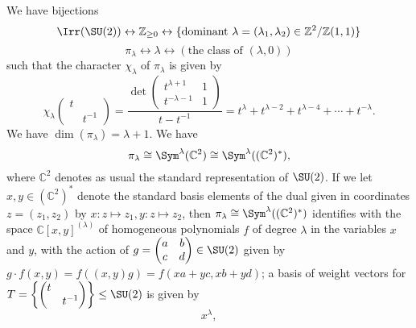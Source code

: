 \documentclass[reqno]{amsart} 
\begin{document}
\begin{theorem}
  We have bijections
  \begin{equation}\label{eq:}
    \Irr(\SU(2))
    \leftrightarrow
    \mathbb{Z}_{\geq 0}
    \leftrightarrow 
    \{\text{dominant }
    \lambda = (\lambda_1,\lambda_2) \in
    \mathbb{Z}^2/\mathbb{Z}(1,1)\}
  \end{equation}
  \begin{equation*}
    \pi_\lambda \leftrightarrow \lambda \leftrightarrow (\text{the class of }(\lambda,0))
  \end{equation*}
  such that the character $\chi_\lambda$ of $\pi_\lambda$ is given by
  \begin{equation}\label{eq:char-formula-SU2}
    \chi_\lambda 
\begin{pmatrix}
      t &  \\
        & t^{-1}
    \end{pmatrix}
    =
    \frac{\det 
\begin{pmatrix}
      t^{\lambda+1} & 1 \\
      t^{-\lambda-1} & 1
    \end{pmatrix}
}{ t - t^{-1}} = t^{\lambda} + t^{\lambda-2} + t^{\lambda-4} + \dotsb + t^{-\lambda}.
\end{equation}
We have $\dim(\pi_\lambda) = \lambda + 1$.  We have
\begin{equation}
  \pi_\lambda
  \cong \Sym^\lambda(\mathbb{C}^2)
  \cong
  \Sym^\lambda ((\mathbb{C}^2)^*),
\end{equation}
where $\mathbb{C}^2$ denotes as usual the standard representation of $\SU(2)$.  If we let $x,y \in (\mathbb{C}^2)^*$ denote the standard basis elements of the dual given in coordinates $z = (z_1,z_2)$ by $x : z \mapsto z_1, y : z \mapsto z_2$, then $\pi_\lambda \cong \Sym^\lambda((\mathbb{C}^2)^*)$ identifies with the space $\mathbb{C}[x,y]^{(\lambda)}$ of homogeneous polynomials $f$ of degree $\lambda$ in the variables $x$ and $y$, with the action of $g = 
\begin{pmatrix}
  a & b \\
  c & d
\end{pmatrix}
 \in \SU(2)$ given by $g \cdot f(x,y) = f((x,y) g) = f(x a + y c, x b + y d)$; a basis of weight vectors for $T = \left\{ 
\begin{pmatrix}
  t &  \\
    & t^{-1}
\end{pmatrix}
 \right\} \leq \SU(2)$ is given by
\begin{equation}
  x^{\lambda},

\end{equation}
\end{theorem}
\end{document}
